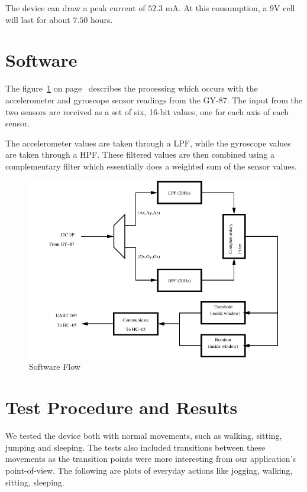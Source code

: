 \documentclass[11pt, a4paper]{article}
\begin{document}
\noindent The device can draw a peak current of $52.3$ mA. At this
consumption, a 9V cell will last for about $7.50$ hours.

\section{Software}
The figure~\ref{fig:sw_flow} on page~\pageref{fig:sw_flow} describes the
processing which occurs with the accelerometer and gyroscope sensor readings
from the GY-87. The input from the two sensors are received as a set of six,
16-bit values, one for each axis of each sensor. 

The accelerometer values are taken through a LPF, while the gyroscope values
are taken through a HPF. These filtered values are then combined using a
complementary filter which essentially does a weighted sum of the sensor
values.

\begin{figure}[htb]
    \centering
    \includegraphics[width=\linewidth]{SW_Flow.pdf}
    \caption{Software Flow}
    \label{fig:sw_flow}
\end{figure}


\section{Test Procedure and Results}
We tested the device both with normal movements, such as walking, sitting,
jumping and sleeping. The tests also included transitions between these
movements as the transition points were more interesting from our
application's point-of-view. The following are plots of everyday actions
like jogging, walking, sitting, sleeping.
\end{document}
